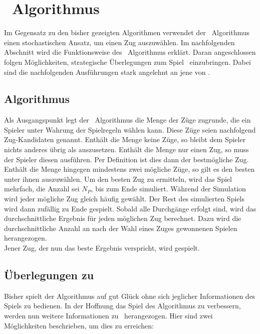 \section{\mc\ Algorithmus}
\label{mc_algo}
Im Gegensatz zu den bisher gezeigten Algorithmen verwendet der \mc\ Algorithmus einen stochastischen Ansatz, um einen Zug auszuwählen. Im nachfolgenden Abschnitt wird die Funktionsweise des \mc\ Algorithmus erklärt. Daran angeschlossen folgen Möglichkeiten, strategische Überlegungen zum Spiel \ot\ einzubringen. Dabei sind die nachfolgenden Ausführungen stark angelehnt an jene von \cite{nijssen_2007}.
\subsection{Algorithmus}
Als Ausgangspunkt legt der \mc\ Algorithmus die Menge der Züge zugrunde, die ein Spieler unter Wahrung der Spielregeln wählen kann. Diese Züge seien nachfolgend Zug-Kandidaten genannt. Enthält die Menge keine Züge, so bleibt dem Spieler nichts anderes übrig als auszusetzen. Enthält die Menge nur einen Zug, so muss der Spieler diesen ausführen. Per Definition ist dies dann der bestmögliche Zug. Enthält die Menge hingegen mindestens zwei mögliche Züge, so gilt es den besten unter ihnen auszuwählen. Um den besten Zug zu ermitteln, wird das Spiel mehrfach, die Anzahl sei $N_{P}$, bis zum Ende simuliert. Während der Simulation wird jeder mögliche Zug gleich häufig gewählt. Der Rest des simulierten Spiels wird dann zufällig zu Ende gespielt. Sobald alle Durchgänge erfolgt sind, wird das durchschnittliche Ergebnis für jeden möglichen Zug berechnet. Dazu wird die durchschnittliche Anzahl an nach der Wahl eines Zuges gewonnenen Spielen herangezogen.
\\Jener Zug, der nun das beste Ergebnis verspricht, wird gespielt.
\subsection{Überlegungen zu \ot}
Bisher spielt der Algorithmus auf gut Glück ohne sich jeglicher Informationen des Spiels zu bedienen. In der Hoffnung das Spiel des Algorithmus zu verbessern, werden nun weitere Informationen zu \ot\ herangezogen. Hier sind zwei Möglichkeiten beschrieben, um dies zu erreichen:
